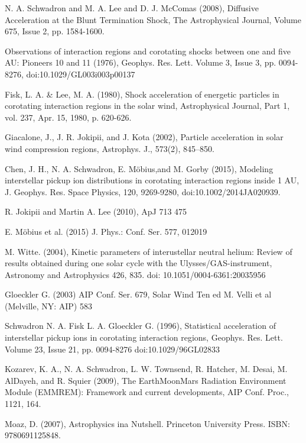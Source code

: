 \documentclass[%
 reprint,
 amsmath,amssymb,
 aps,
]{revtex4-1}
\begin{document}
\begin{thebibliography}{22}
 N. A. Schwadron and M. A. Lee and D. J. McComas (2008), Diffusive Acceleration at the Blunt Termination Shock, The Astrophysical Journal, Volume 675, Issue 2, pp. 1584-1600.

 Observations of interaction regions and corotating shocks between one and five AU: Pioneers 10 and 11 (1976), Geophys. Res. Lett. Volume 3, Issue 3, pp. 0094-8276, doi:10.1029/GL003i003p00137

 Fisk, L. A. \& Lee, M. A. (1980), Shock acceleration of energetic particles in corotating interaction regions in the solar wind, Astrophysical Journal, Part 1, vol. 237, Apr. 15, 1980, p. 620-626.

 Giacalone, J., J. R. Jokipii, and J. Kota (2002), Particle acceleration in solar wind compression regions, Astrophys. J., 573(2), 845–850.

 Chen, J. H., N. A. Schwadron, E. Möbius,and M. Gorby (2015), Modeling interstellar pickup ion distributions in corotating interaction regions inside 1 AU, J. Geophys. Res. Space Physics, 120, 9269-9280, doi:10.1002/2014JA020939.

 R. Jokipii and Martin A. Lee (2010), ApJ 713 475

 E. Möbius et al. (2015) J. Phys.: Conf. Ser. 577, 012019

 M. Witte. (2004), Kinetic parameters of interustellar neutral helium: Review of results obtained during one solar cycle with the Ulysses/GAS-instrument, Astronomy and Astrophysics 426, 835. doi: 10.1051/0004-6361:20035956

 Gloeckler G. (2003) AIP Conf. Ser. 679, Solar Wind Ten ed M. Velli et al (Melville, NY: AIP) 583

 Schwadron N. A. Fisk L. A. Gloeckler G. (1996), Statistical acceleration of interstellar pick\textemdash up ions in co\textemdash rotating interaction regions, Geophys. Res. Lett. Volume 23, Issue 21, pp. 0094-8276 doi:10.1029/96GL02833

 Kozarev, K. A., N. A. Schwadron, L. W. Townsend, R. Hatcher, M. Desai, M. Al\textemdash Dayeh, and R. Squier (2009), The Earth\textemdash Moon\textemdash Mars Radiation Environment Module (EMMREM): Framework and current developments, AIP Conf. Proc., 1121, 164. 

 Moaz, D. (2007), Astrophysics ina Nutshell. Princeton University Press. ISBN: 9780691125848.

\end{thebibliography}
\end{document}
